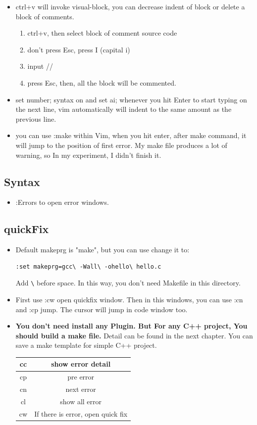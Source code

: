 \documentclass[a4paper,12pt,twoside]{book}
\begin{document}
\begin{itemize}
\begin{itemize}
	 \item ctrl+v will invoke visual-block, you can decrease indent of block or delete a block of comments. 
	 
			 \begin{enumerate}
					 \item ctrl+v, then select block of comment source code 
					 \item don't press Esc, press I (capital i) 
					 \item input // \\
					 \item press Esc, then, all the block will be commented.
			   \end{enumerate}
	 \item set number; syntax on and set ai;  whenever you hit Enter to start typing on the next line, vim automatically will indent to the same amount as the previous line.

		\item you can use :make within Vim, when you hit enter, after make command, it will jump to the position of first error. My make file produces a lot of warning, so In my experiment, I didn't finish it.  
 
\end{itemize}

\subsection{Syntax}
\begin{itemize}
		\item :Errors to open error windows.  
\end{itemize}
\subsection{quickFix}
\begin{itemize}
\item Default makeprg is "make", but you can use change it to:
\begin{verbatim}
:set makeprg=gcc\ -Wall\ -ohello\ hello.c 
\end{verbatim}

Add \verb=\= before space. In this way, you don't need Makefile in this directory.
\item First use :cw open quickfix window. Then in this windows, you can use :cn and :cp jump. The cursor will jump in code window  too. 
\item \textbf{You don't need install any Plugin. But For any C++ project, You should build a make file.} Detail can be found in the next chapter.  You can save a make template for simple C++ project. 
\begin{tabular}{c|c}
\hline
cc  &    show error detail \\
\hline
cp  &     pre error \\ 
\hline
cn &   next error\\ 
\hline
cl &     show all error\\
\hline
cw &    If there is error, open quick fix \\


\end{tabular}
\end{itemize}
\end{itemize}
\end{document}
